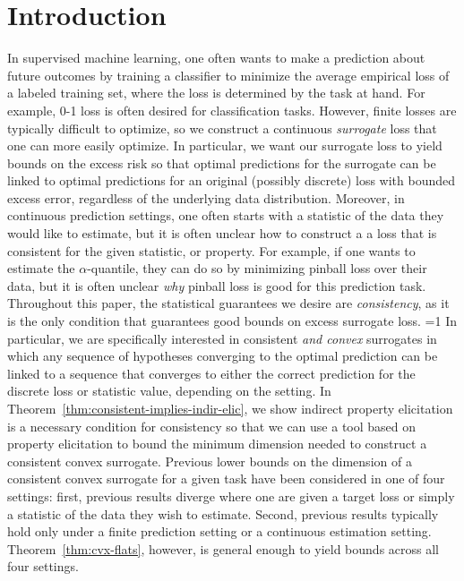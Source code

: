 \documentclass{article}
\newcommand{\Comments}{1}
\newcommand{\mytodo}[2]{\ifnum\Comments=1%
	\todo[linecolor=#1!80!black,backgroundcolor=#1,bordercolor=#1!80!black]{#2}\fi}
\newcommand{\jessiet}[1]{\mytodo{purple!20!white}{JF: #1}}
\begin{document}
\section{Introduction}\label{sec:intro}
In supervised machine learning, one often wants to make a prediction about future outcomes by training a classifier to minimize the average empirical loss of a labeled training set, where the loss is determined by the task at hand.
For example, 0-1 loss is often desired for classification tasks.
However, finite losses are typically difficult to optimize, so we construct a continuous \emph{surrogate} loss that one can more easily optimize.
In particular, we want our surrogate loss to yield bounds on the excess risk so that optimal predictions for the surrogate can be linked to optimal predictions for an original (possibly discrete) loss with bounded excess error, regardless of the underlying data distribution.
Moreover, in continuous prediction settings, one often starts with a statistic of the data they would like to estimate, but it is often unclear how to construct a a loss that is consistent for the given statistic, or property.
For example, if one wants to estimate the $\alpha$-quantile, they can do so by minimizing pinball loss over their data, but it is often unclear \emph{why} pinball loss is good for this prediction task.
Throughout this paper, the statistical guarantees we desire are \emph{consistency}, as it is the only condition that guarantees good bounds on excess surrogate loss. \jessiet{Raf, maybe fill in here?}
In particular, we are specifically interested in consistent \emph{and convex} surrogates in which any sequence of hypotheses converging to the optimal prediction can be linked to a sequence that converges to either the correct prediction for the discrete loss or statistic value, depending on the setting. 
In Theorem~\ref{thm:consistent-implies-indir-elic}, we show indirect property elicitation is a necessary condition for consistency so that we can use a tool based on property elicitation to bound the minimum dimension needed to construct a consistent convex surrogate.
Previous lower bounds on the dimension of a consistent convex surrogate for a given task have been considered in one of four settings: first, previous results diverge where one are given a target loss or simply a statistic of the data they wish to estimate.
Second, previous results typically hold only under a finite prediction setting or a continuous estimation setting.
Theorem~\ref{thm:cvx-flats}, however, is general enough to yield bounds across all four settings.
\end{document}
